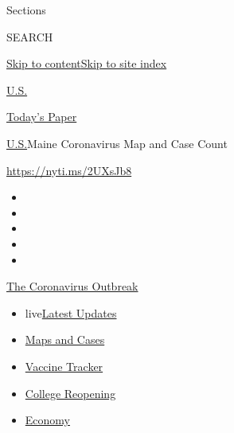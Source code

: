 Sections

SEARCH

\protect\hyperlink{site-content}{Skip to
content}\protect\hyperlink{site-index}{Skip to site index}

\href{https://www.nytimes3xbfgragh.onion/section/us}{U.S.}

\href{https://myaccount.nytimes3xbfgragh.onion/auth/login?response_type=cookie\&client_id=vi}{}

\href{https://www.nytimes3xbfgragh.onion/section/todayspaper}{Today's
Paper}

\href{/section/us}{U.S.}\textbar{}Maine Coronavirus Map and Case Count

\url{https://nyti.ms/2UXsJb8}

\begin{itemize}
\item
\item
\item
\item
\item
\end{itemize}

\href{https://www.nytimes3xbfgragh.onion/news-event/coronavirus?action=click\&pgtype=Article\&state=default\&region=TOP_BANNER\&context=storylines_menu}{The
Coronavirus Outbreak}

\begin{itemize}
\tightlist
\item
  live\href{https://www.nytimes3xbfgragh.onion/2020/08/03/world/coronavirus-covid-19.html?action=click\&pgtype=Article\&state=default\&region=TOP_BANNER\&context=storylines_menu}{Latest
  Updates}
\item
  \href{https://www.nytimes3xbfgragh.onion/interactive/2020/us/coronavirus-us-cases.html?action=click\&pgtype=Article\&state=default\&region=TOP_BANNER\&context=storylines_menu}{Maps
  and Cases}
\item
  \href{https://www.nytimes3xbfgragh.onion/interactive/2020/science/coronavirus-vaccine-tracker.html?action=click\&pgtype=Article\&state=default\&region=TOP_BANNER\&context=storylines_menu}{Vaccine
  Tracker}
\item
  \href{https://www.nytimes3xbfgragh.onion/2020/08/02/us/covid-college-reopening.html?action=click\&pgtype=Article\&state=default\&region=TOP_BANNER\&context=storylines_menu}{College
  Reopening}
\item
  \href{https://www.nytimes3xbfgragh.onion/live/2020/08/03/business/stock-market-today-coronavirus?action=click\&pgtype=Article\&state=default\&region=TOP_BANNER\&context=storylines_menu}{Economy}
\end{itemize}

